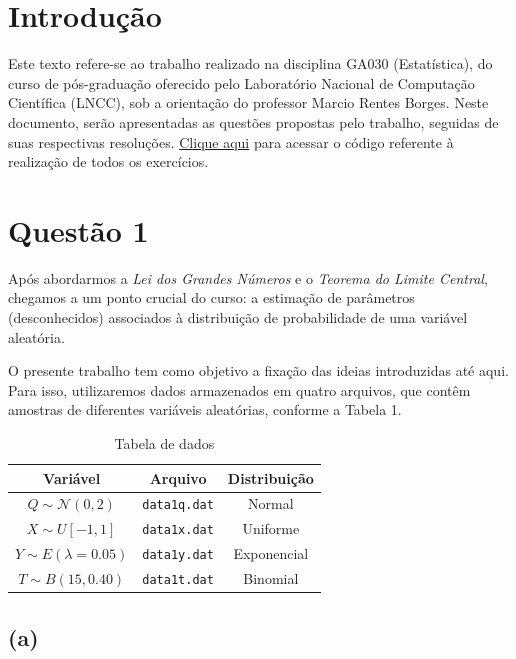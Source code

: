 \documentclass[a4paper, 11pt]{article}
\begin{document}
\tableofcontents
\newpage

\section{\textbf{Introdução}}

Este texto refere-se ao trabalho realizado na disciplina GA030 (Estatística), do curso de pós-graduação oferecido pelo Laboratório Nacional de Computação Científica (LNCC), sob a orientação do professor Marcio Rentes Borges. Neste documento, serão apresentadas as questões propostas pelo trabalho, seguidas de suas respectivas resoluções. \href{https://github.com/lorran-araujo/LNCC/blob/main/disciplinas/estatistica/trab1/trab.ipynb}{Clique aqui} para acessar o código referente à realização de todos os exercícios.

\section{\textbf{Questão 1}}
\noindent Após abordarmos a \textit{Lei dos Grandes Números} e o \textit{Teorema do Limite Central}, chegamos a um ponto crucial do curso: a estimação de parâmetros (desconhecidos) associados à distribuição de probabilidade de uma variável aleatória.

\noindent O presente trabalho tem como objetivo a fixação das ideias introduzidas até aqui. Para isso, utilizaremos dados armazenados em quatro arquivos, que contêm amostras de diferentes variáveis aleatórias, conforme a Tabela 1.

\begin{table}[H]
    \centering
    \begin{tabular}{|c|c|c|}
        \hline
        \textbf{Variável} & \textbf{Arquivo} & \textbf{Distribuição} \\
        \hline
        $Q \sim \mathcal{N}(0, 2)$ & \texttt{data1q.dat} & Normal \\
        $X \sim U[-1, 1]$ & \texttt{data1x.dat} & Uniforme \\
        $Y \sim E(\lambda = 0.05)$ & \texttt{data1y.dat} & Exponencial \\
        $T \sim B(15, 0.40)$ & \texttt{data1t.dat} & Binomial \\
        \hline
    \end{tabular}
    \caption{Tabela de dados}
    \label{tab:dados}
\end{table}

\subsection{\textbf{(a)}}
\end{document}
